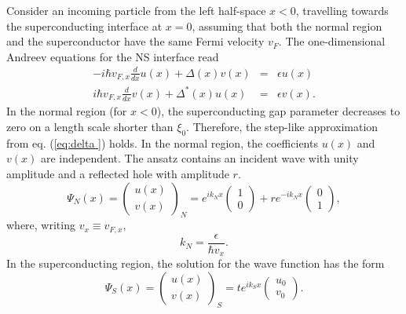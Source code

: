 Consider an incoming particle from the left half-space $x < 0 $, travelling towards the superconducting interface at $x=0$, assuming that both the normal region and the superconductor have the same Fermi velocity $v_F$. The one-dimensional Andreev equations for the NS interface read
\begin{eqnarray}
- i \hbar v_{F, x} \frac{d}{d x} u \left( x \right)  + \Delta(x) v \left( x \right) &=& \epsilon u \left( x \right)\\
 i \hbar v_{F, x} \frac{d}{d x} v \left( x \right) + \Delta^*(x) u \left( x \right) &=& \epsilon v \left( x \right).
\end{eqnarray}
In the normal region (for $x < 0$), the superconducting gap parameter decreases to zero on a length scale shorter than $\xi_0$. Therefore, the step-like approximation from eq. (\ref{eq:delta }) holds. In the normal region, 
the coefficients $u \left( x \right)$ and $v \left( x \right)$ are independent. The ansatz contains an incident wave with unity amplitude and a reflected hole with amplitude $r$. 
\begin{equation}
\Psi_N \left( x \right) = \begin{pmatrix} u \left( x \right) \\ v \left( x \right) \end{pmatrix}_N = e^{i k_N x } \begin{pmatrix} 1 \\ 0 \end{pmatrix} + r e^{-i k_N x } \begin{pmatrix} 0 \\ 1 \end{pmatrix},  \label{eq:psi-normal}
\end{equation}
where, writing $v_x \equiv v_{F, x}$, 
\begin{equation}
k_N = \frac{\epsilon}{\hbar v_x}.
\end{equation}
In the superconducting region, the solution for the wave function has the form
\begin{equation}
\Psi_S \left( x \right) = \begin{pmatrix} u \left( x \right) \\ v \left( x \right) \end{pmatrix}_S = t e^{i k_S x } \begin{pmatrix} u_0 \\ v_0 \end{pmatrix}.
\end{equation}
